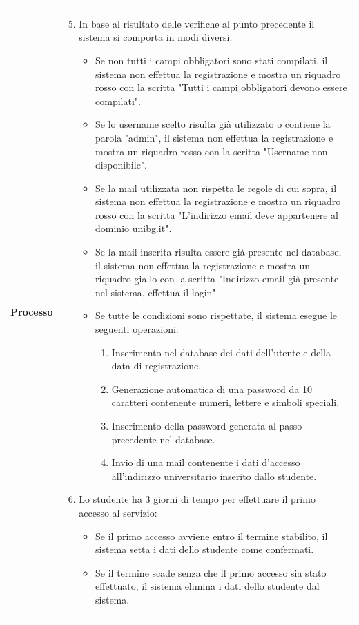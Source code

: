 \documentclass[10pt,a4paper]{report}
\begin{document}
	\begin{tabular}{lp{}}
		\textbf{Processo}&\begin{enumerate}
			\setcounter{enumi}{4}
			\item In base al risultato delle verifiche al punto precedente il sistema si comporta in modi diversi:
			\begin{itemize}
				\item Se non tutti i campi obbligatori sono stati compilati, il sistema non effettua la registrazione e mostra un riquadro rosso con la scritta "Tutti i campi obbligatori devono essere compilati".
				\item Se lo username scelto risulta già utilizzato o contiene la parola "admin", il sistema non effettua la registrazione e mostra un riquadro rosso con la scritta "Username non disponibile".
				\item Se la mail utilizzata non rispetta le regole di cui sopra, il sistema non effettua la registrazione e mostra un riquadro rosso con la scritta "L'indirizzo email deve appartenere al dominio unibg.it".
				\item Se la mail inserita risulta essere già presente nel database, il sistema non effettua la registrazione e mostra un riquadro giallo con la scritta "Indirizzo email già presente nel sistema, effettua il login".
				\item Se tutte le condizioni sono rispettate, il sistema esegue le seguenti operazioni:
				\begin{enumerate}
					\item Inserimento nel database dei dati dell'utente e della data di registrazione.
					\item Generazione automatica di una password da 10 caratteri contenente numeri, lettere e simboli speciali.
					\item Inserimento della password generata al passo precedente nel database.
					\item Invio di una mail contenente i dati d'accesso all'indirizzo universitario inserito dallo studente.
				\end{enumerate}
			\end{itemize}
			\item Lo studente ha 3 giorni di tempo per effettuare il primo accesso al servizio:
			\begin{itemize}
				\item Se il primo accesso avviene entro il termine stabilito, il sistema setta i dati dello studente come confermati.
				\item Se il termine scade senza che il primo accesso sia stato effettuato, il sistema elimina i dati dello studente dal sistema.
			\end{itemize}
		\end{enumerate}
	\end{tabular}
	
\end{document}
